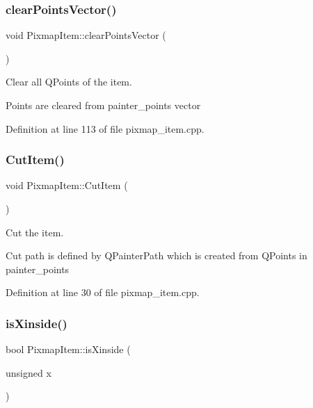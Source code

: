 \subsubsection{\texorpdfstring{clear\+Points\+Vector()}{clearPointsVector()}}
{\footnotesize\ttfamily void Pixmap\+Item\+::clear\+Points\+Vector (\begin{DoxyParamCaption}{ }\end{DoxyParamCaption})}



Clear all Q\+Points of the item. 

Points are cleared from painter\+\_\+points vector 

Definition at line 113 of file pixmap\+\_\+item.\+cpp.

\mbox{\label{classPixmapItem_a4a742318dce01d018da2f4b01790c210}} 
\subsubsection{\texorpdfstring{Cut\+Item()}{CutItem()}}
{\footnotesize\ttfamily void Pixmap\+Item\+::\+Cut\+Item (\begin{DoxyParamCaption}{ }\end{DoxyParamCaption})}



Cut the item. 

Cut path is defined by Q\+Painter\+Path which is created from Q\+Points in painter\+\_\+points 

Definition at line 30 of file pixmap\+\_\+item.\+cpp.

\mbox{\label{classPixmapItem_ad5510bf5a97b352e3b06cb888ac0a99c}} 
\subsubsection{\texorpdfstring{is\+Xinside()}{isXinside()}}
{\footnotesize\ttfamily bool Pixmap\+Item\+::is\+Xinside (\begin{DoxyParamCaption}\item[{unsigned}]{x }\end{DoxyParamCaption})}



